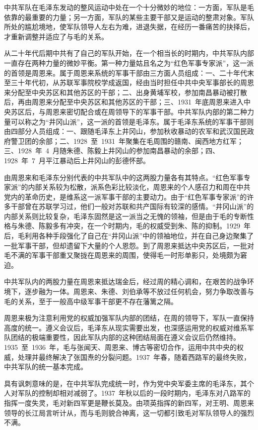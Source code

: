 中共军队在毛泽东发动的整风运动中处在一个十分微妙的地位：一方面，军队是毛依靠的最重要的力量；另一方面，军队的某些主要干部又是运动的整肃对象。军队所处的尴尬境地，使军队领导人左右为难，进退失据，在经历一番痛苦的抉择后，才重新调整并适应了与毛的关系。

从二十年代后期中共有了自己的军队开始，在一个相当长的时期内，中共军队内部一直存在两种力量的微妙平衡。第一种力量姑且名之为“红色军事专家派”，这一派的首领是周恩来。属于周恩来系统的军事干部由三方面人员组成：一、二十年代末至三十年代初，从苏联军事院校学成返国，经由当时担任中共中央军事部长的周恩来分配至中央苏区和其他苏区的干部；二、出身黄埔军校，参加南昌暴动被打散后，再由周恩来分配至中央苏区和其他苏区的干部；三、1931~年底周恩来进入中央苏区后，与周恩来密切配合或在周领导下的军事干部。中共军队内部的第二种力量可以称之为“井冈山派”，这一派的首领是毛泽东。属于毛泽东系统的军事干部则由四部分人员组成：一、跟随毛泽东上井冈山，参加秋收暴动的农军和武汉国民政府警卫团的余部；二、1928~至~1931~年聚集在毛周围的赣南、闽西地方红军；三、1928~年~4~月随朱德、陈毅上井冈山的参加南昌暴动的余部；四、1928~年~7~月平江暴动后上井冈山的彭德怀部。

由周恩来和毛泽东分别代表的中共军队中的这两股力量各有其特点。“红色军事专家派”的内部关系较为松散，派系色彩比较淡化，周恩来的个人感召力和周在中共党内的革命历史，是维系这一派军事干部的主要动力。由于“红色军事专家派”的许多干部曾在苏联学习过，他们一般对苏联和共产国际有较深的感情。“井冈山派”的内部关系则比较复杂，毛泽东固然是这一派当之无愧的领袖，但是由于毛的专断性格与朱德、陈毅多有冲突，在一个时期内，毛的权威受到朱、陈的抑制。1929~年后，毛利用各种手段强化了自己在“井冈山派”中的领袖地位，并在自己身边聚集了一批军事干部，但却遗留下大量的个人恩怨。到了周恩来抵达中央苏区后，一批对毛不满的军事干部重又聚拢在周恩来的周围，使得毛一时形单影只，处境颇为窘迫。

中共军队内的两股力量在周恩来抵达瑞金后，经过周的精心调和，在艰苦的战争环境下，逐步融为一体。周恩来、朱德、刘伯承等不放过任何机会，努力争取改善与毛的关系，至于一般高中级军事干部更不存在藩篱之隔。

周恩来极为注意利用党的权威加强军队内部的团结，在周的领导下，军队一直保持高度的统一。遵义会议后，毛泽东从现实需要出发，也深感运用党的权威对维系军队团结的极端重要性，因此军队内部的这种团结局面在遵义会议后仍然维持。1935~至~1936~年，毛与张闻天、周恩来、博古等密切合作，运用中共中央的权威，处理并最终解决了张国焘的分裂问题。1937~年春，随着西路军的最终失败，中共军队的统一基本完成。

具有讽刺意味的是，在中共军队完成统一时，作为党中央军委主席的毛泽东，其个人对军队的控制却相对减弱了。1937~年秋以后的一段时期内，毛泽东对八路军的指挥一度失灵，毛对新四军更是鞭长莫及。由项英指挥的新四军，对王明、周恩来领导的长江局言听计从，而与毛则貌合神离，这一切都引致毛对军队领导人的强烈不满。


